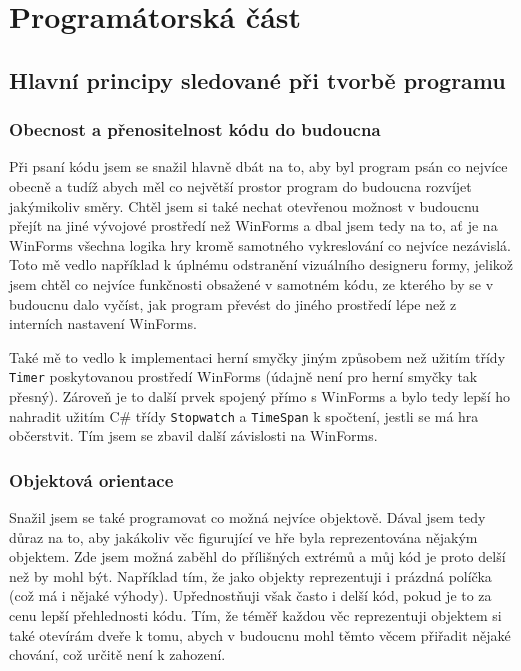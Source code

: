 \documentclass[a4]{article}
\begin{document}
\section{Programátorská část}
\subsection{Hlavní principy sledované při tvorbě programu}

\subsubsection{Obecnost a přenositelnost kódu do budoucna}
Při psaní kódu jsem se snažil hlavně dbát na to, aby byl program psán co nejvíce obecně a tudíž abych měl co největší prostor program do budoucna rozvíjet jakýmikoliv směry. Chtěl jsem si také nechat otevřenou možnost v budoucnu přejít na jiné vývojové prostředí než WinForms a dbal jsem tedy na to, ať je na WinForms všechna logika hry kromě samotného vykreslování co nejvíce nezávislá. Toto mě vedlo například k úplnému odstranění vizuálního designeru formy, jelikož jsem chtěl co nejvíce funkčnosti obsažené v samotném kódu, ze kterého by se v budoucnu dalo vyčíst, jak program převést do jiného prostředí lépe než z interních nastavení WinForms.

Také mě to vedlo k implementaci herní smyčky jiným způsobem než užitím třídy \verb|Timer| poskytovanou prostředí WinForms (údajně není pro herní smyčky tak přesný). Zároveň je to další prvek spojený přímo s WinForms a bylo tedy lepší ho nahradit užitím C\# třídy \verb|Stopwatch| a \verb|TimeSpan| k spočtení, jestli se má hra občerstvit. Tím jsem se zbavil další závislosti na WinForms.

\subsubsection{Objektová orientace}
Snažil jsem se také programovat co možná nejvíce objektově. Dával jsem tedy důraz na to, aby jakákoliv věc figurující ve hře byla reprezentována nějakým objektem. Zde jsem možná zaběhl do přílišných extrémů a můj kód je proto delší než by mohl být. Například tím, že jako objekty reprezentuji i prázdná políčka (což má i nějaké výhody). Upřednostňuji však často i delší kód, pokud je to za cenu lepší přehlednosti kódu. Tím, že téměř každou věc reprezentuji objektem si také otevírám dveře k tomu, abych v budoucnu mohl těmto věcem přiřadit nějaké chování, což určitě není k zahození.
\end{document}
